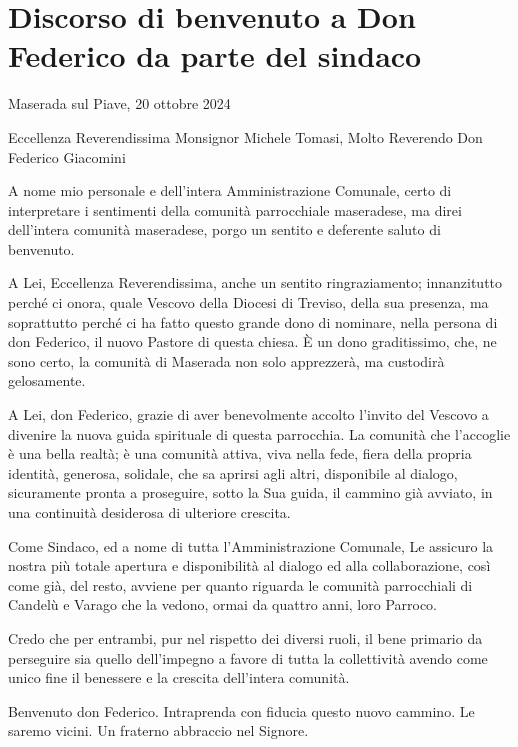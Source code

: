 \section{Discorso di benvenuto a Don Federico da parte del sindaco}

Maserada sul Piave, 20 ottobre 2024

Eccellenza Reverendissima Monsignor Michele Tomasi, Molto Reverendo Don Federico Giacomini

A nome mio personale e dell’intera Amministrazione Comunale, certo di interpretare i sentimenti della comunità parrocchiale maseradese, ma direi dell’intera comunità maseradese, porgo un sentito e deferente saluto di benvenuto.

A Lei, Eccellenza Reverendissima, anche un sentito ringraziamento; innanzitutto perché ci onora, quale Vescovo della Diocesi di Treviso, della sua presenza, ma soprattutto perché ci ha fatto questo grande dono di nominare, nella persona di don Federico, il nuovo Pastore di questa chiesa. È un dono graditissimo, che, ne sono certo, la comunità di Maserada non solo apprezzerà, ma custodirà gelosamente.

A Lei, don Federico, grazie di aver benevolmente accolto l’invito del Vescovo a divenire la nuova guida spirituale di questa parrocchia. La comunità che l’accoglie è una bella realtà; è una comunità attiva, viva nella fede, fiera della propria identità, generosa, solidale, che sa aprirsi agli altri, disponibile al dialogo, sicuramente pronta a proseguire, sotto la Sua guida, il cammino già avviato, in una continuità desiderosa di ulteriore crescita.

Come Sindaco, ed a nome di tutta l'Amministrazione Comunale, Le assicuro la nostra più totale apertura e disponibilità al dialogo ed alla collaborazione, così come già, del resto, avviene per quanto riguarda le comunità parrocchiali di Candelù e Varago che la vedono, ormai da quattro anni, loro Parroco.

Credo che per entrambi, pur nel rispetto dei diversi ruoli, il bene primario da perseguire sia quello dell’impegno a favore di tutta la collettività avendo come unico fine il benessere e la crescita dell’intera comunità.

Benvenuto don Federico. Intraprenda con fiducia questo nuovo cammino. Le saremo vicini. Un fraterno abbraccio nel Signore.

